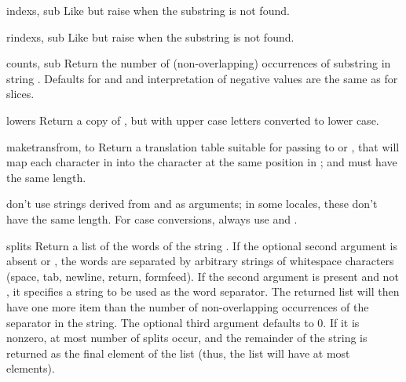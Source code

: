 \begin{funcdesc}{index}{s, sub}
  Like  but raise  when the
  substring is not found.
\end{funcdesc}

\begin{funcdesc}{rindex}{s, sub}
  Like  but raise  when the
  substring is not found.
\end{funcdesc}

\begin{funcdesc}{count}{s, sub}
  Return the number of (non-overlapping) occurrences of substring
   in string .
  Defaults for  and  and interpretation of
  negative values are the same as for slices.
\end{funcdesc}

\begin{funcdesc}{lower}{s}
  Return a copy of , but with upper case letters converted to
  lower case.
\end{funcdesc}

\begin{funcdesc}{maketrans}{from, to}
  Return a translation table suitable for passing to
   or , that will map
  each character in  into the character at the same position
  in ;  and  must have the same length.

   don't use strings derived from 
  and  as arguments; in some locales, these don't have
  the same length.  For case conversions, always use
   and .
\end{funcdesc}

\begin{funcdesc}{split}{s}
  Return a list of the words of the string .  If the optional
  second argument  is absent or , the words are
  separated by arbitrary strings of whitespace characters (space, tab, 
  newline, return, formfeed).  If the second argument  is
  present and not , it specifies a string to be used as the 
  word separator.  The returned list will then have one more item
  than the number of non-overlapping occurrences of the separator in
  the string.  The optional third argument  defaults to
  0.  If it is nonzero, at most  number of splits occur,
  and the remainder of the string is returned as the final element of
  the list (thus, the list will have at most 
  elements).
\end{funcdesc}

